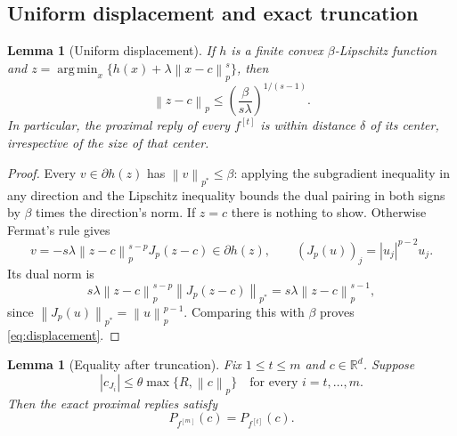 \documentclass[11pt]{article}
\newtheorem{lemma}[theorem]{Lemma}
\theoremstyle{definition}
\theoremstyle{remark}
\newcommand{\R}{\mathbb R}
\newcommand{\norm}[1]{\left\lVert#1\right\rVert}
\DeclareMathOperator*{\argmin}{arg\,min}
\begin{document}
\subsection{Uniform displacement and exact truncation}

\begin{lemma}[Uniform displacement]\label{lem:displacement}
If $h$ is a finite convex $\beta$-Lipschitz function and
$z=\argmin_x\{h(x)+\lambda\norm{x-c}_p^s\}$, then
\begin{equation}\label{eq:displacement}
\norm{z-c}_p\le\left(\frac{\beta}{s\lambda}\right)^{1/(s-1)}.
\end{equation}
In particular, the proximal reply of every $f^{[t]}$ is within distance
$\delta$ of its center, irrespective of the size of that center.
\end{lemma}

\begin{proof}
Every $v\in\partial h(z)$ has $\norm{v}_{p^*}\le\beta$: applying the
subgradient inequality in any direction and the Lipschitz inequality bounds
the dual pairing in both signs by $\beta$ times the direction's norm.
If $z=c$ there is nothing to show. Otherwise Fermat's rule gives
\[
v=-s\lambda\norm{z-c}_p^{s-p}J_p(z-c)\in\partial h(z),
\qquad (J_p(u))_j=|u_j|^{p-2}u_j.
\]
Its dual norm is
\[
s\lambda\norm{z-c}_p^{s-p}\norm{J_p(z-c)}_{p^*}
=s\lambda\norm{z-c}_p^{s-1},
\]
since $\norm{J_p(u)}_{p^*}=\norm{u}_p^{p-1}$. Comparing this with $\beta$
proves \eqref{eq:displacement}.
\end{proof}

\begin{lemma}[Equality after truncation]\label{lem:exact}
Fix $1\le t\le m$ and $c\in\R^d$. Suppose
\begin{equation}\label{eq:coordinate-event}
|c_{J_i}|\le\theta\max\{R,\norm{c}_p\}
\quad\text{for every }i=t,\ldots,m.
\end{equation}
Then the exact proximal replies satisfy
\begin{equation}\label{eq:exact-reply}
P_{f^{[m]}}(c)=P_{f^{[t]}}(c).
\end{equation}
\end{lemma}
\end{document}

